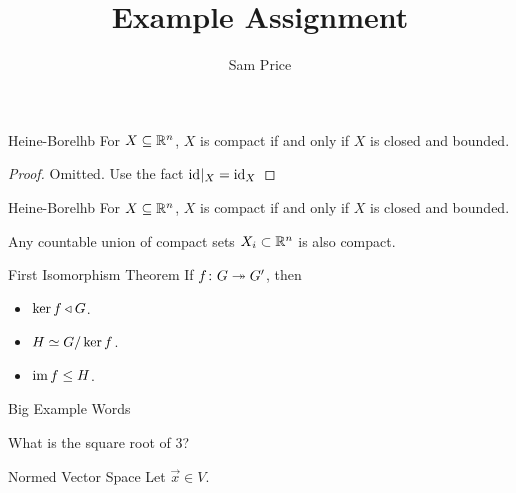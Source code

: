 \documentclass{article}
\author{Sam Price}
\title{Example Assignment}
\begin{document}
\maketitle

\begin{theorem}{Heine-Borel}{hb}
  For $X \subseteq \RR[n]$, $X$ is compact if and only if $X$ is closed and bounded.
\end{theorem}

\begin{proof}
  Omitted. Use the fact $\id|_{X} = \id[X]$
\end{proof}

\begin{lemma}{Heine-Borel}{hb}
  For $X \subseteq \RR[n]$, $X$ is compact if and only if $X$ is closed and bounded.
\end{lemma}

\begin{corollary}{}{}
  Any countable union of compact sets $X_{i} \subset \RR[n]$ is also compact.
\end{corollary}

\begin{proposition}{First Isomorphism Theorem}{}
  If $f \from G \surjto G'$, then
  \begin{itemize}
    \item $\ker f \normalto G$.
    \item $H \iso G / \ker f$.
    \item $\im f \le H$.
  \end{itemize}
\end{proposition}
\begin{example}{Big Example}{}
  Words
\end{example}

\begin{question}{}{}
  What is the square root of 3?
\end{question}

\begin{definition}{Normed Vector Space}{}
  Let $\vec{x} \in V$.
\end{definition}
\end{document}

